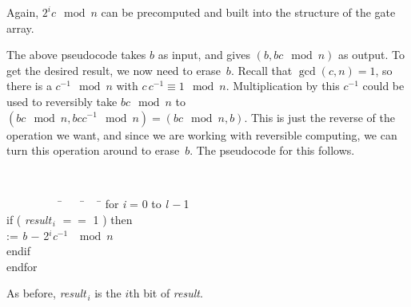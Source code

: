 \noindent
Again, $2^ic\mod{n}$ can be precomputed and built into the 
structure of the gate array.

The above pseudocode takes $b$ as input, and gives $(b,bc\mod{n})$ as 
output.  To get the desired result, we now
need to erase~$b$.  Recall that $\gcd(c,n)=1$, so
there is a $c^{-1}\mod{n}$ with $c \, c^{-1} \equiv 1\mod{n}$.  
Multiplication by this $c^{-1}$ could be used to reversibly take 
$bc\mod{n}$ to $(bc\mod{n},bcc^{-1}\mod{n}) = (bc\mod{n},b)$.   This
is just the reverse of the operation we want, and since we are working
with reversible computing, we can turn this operation around to erase~$b$.  
The pseudocode for this follows.

\vspace{\baselineskip}

\noindent
\begin{minipage}{\textwidth} %
{\tt
\begin{tabbing}
\ \ \ \ \ \ \ \ \ \= \ \ \ \ \= \ \ \ \ \= \kill
\tab for {\it i} = 0 to {\it l}$\,-$1\\
\tab \tab if  ( {\it result}$_{\,i}$ $==$ 1 ) then\\
\tab \tab {} := {\it b} $-$ 2$^{i}${\it c}$^{-1}$ $\mod{n}$\\
\tab \tab endif\\
\tab endfor
\end{tabbing}
}
\end{minipage}

\vspace{\baselineskip}

\noindent
As before, {\it result}$_{\,i}$ is the $i$th bit of {\it result}.

